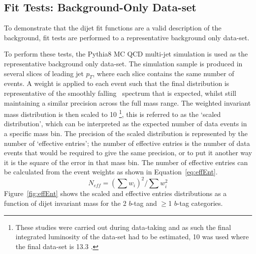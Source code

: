 \subsection{Fit Tests: Background-Only Data-set}
\label{sec:bkg-summer_fitCR}

To demonstrate that the dijet fit functions are a valid description of the background,
fit tests are performed to a representative background only data-set.

To perform these tests, the {\sc Pythia}8 MC QCD multi-jet simulation is used as the representative background only data-set.
The simulation sample is produced in several slices of leading jet $p_{T}$, where each slice contains the same number of events.
A weight is applied to each event such that the final distribution is representative of the smoothly falling~\mjj{} spectrum that is expected,
whilst still maintaining a similar precision across the full mass range.
The weighted invariant mass distribution is then scaled to 10 \ifb{} \footnote{
  These studies were carried out during data-taking
  and as such the final integrated luminosity of the data-set had to be estimated,
  10 \ifb{} was used where the final data-set is 13.3 \ifb{}.
},
this is referred to as the  `scaled distribution', which can be interpreted as the expected number of data events in a specific mass bin. 
The precision of the scaled distribution is represented by the number of `effective entries';
the number of effective entries is the number of data events that would be required to give the same precision,
or to put it another way it is the square of the error in that mass bin. The number of effective entries can be calculated from the event weights as shown in Equation~\ref{eq:effEnt}.
\begin{equation}
  N_{eff} = (\sum{w_i})^2 / \sum{w_i^2}
  \label{eq:effEnt}
\end{equation}
Figure~\ref{fig:effEnt} shows the scaled and effective entries distributions as a function of dijet invariant mass for the 2 $b$-tag and $\geq$1 $b$-tag categories. 

